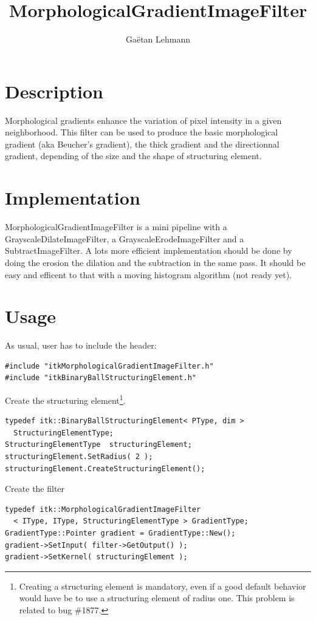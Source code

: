 \documentclass[IJ]{cesj}
\author{Ga\"etan Lehmann}
\institute{Biologie du d\'eveloppement et de la reproduction, INRA de Jouy-en-Josas}
\title{MorphologicalGradientImageFilter}
\begin{document}
\lstset{language=c++}
\maketitle

\section{Description}
Morphological gradients enhance the variation of pixel intensity in a given neighborhood. This filter can be used to produce the basic morphological gradient (aka Beucher's gradient), the thick gradient and the directionnal gradient, depending of the size and the shape of structuring element.

\section{Implementation}
MorphologicalGradientImageFilter is a mini pipeline with a GrayscaleDilateImageFilter, a GrayscaleErodeImageFilter and a SubtractImageFilter. A lots more efficient implementation should be done by doing the erosion the dilation and the subtraction in the same pass. It should be easy and efficent to that with a moving histogram algorithm (not ready yet).

\section{Usage}
As usual, user has to include the header:
\begin{lstlisting}
#include "itkMorphologicalGradientImageFilter.h"
#include "itkBinaryBallStructuringElement.h"
\end{lstlisting}
Create the structuring element\footnote{Creating a structuring element is mandatory, even if a good default behavior would have be to use a structuring element of radius one. This problem is related to bug \#1877.}.
\begin{lstlisting}
typedef itk::BinaryBallStructuringElement< PType, dim >
  StructuringElementType;
StructuringElementType  structuringElement;
structuringElement.SetRadius( 2 );
structuringElement.CreateStructuringElement();
\end{lstlisting}
Create the filter
\begin{lstlisting}
typedef itk::MorphologicalGradientImageFilter
  < IType, IType, StructuringElementType > GradientType;
GradientType::Pointer gradient = GradientType::New();
gradient->SetInput( filter->GetOutput() );
gradient->SetKernel( structuringElement );
\end{lstlisting}
\end{document}
